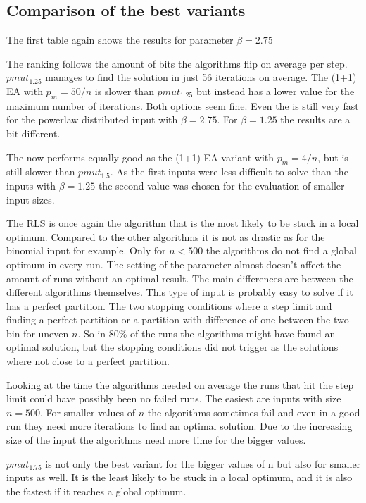 \subsection{Comparison of the best variants}
The first table again shows the results for parameter $\beta=2.75$



The ranking follows the amount of bits the algorithms flip on average per step.
$pmut_{1.25}$ manages to find the solution in just 56 iterations on average.
The (1+1) EA with $p_m=50/n$ is slower than $pmut_{1.25}$ but instead has a lower value for the maximum number of iterations.
Both options seem fine.
Even the \RLSN[4] is still very fast for the powerlaw distributed input with $\beta = 2.75$.
For $\beta = 1.25$ the results are a bit different.



The \RLSR[4] now performs equally good as the (1+1) EA variant with $p_m=4/n$, but is still slower than $pmut_{1.5}$.
As the first inputs were less difficult to solve than the inputs with $\beta = 1.25$ the second value was chosen for the evaluation of smaller input sizes.



The RLS is once again the algorithm that is the most likely to be stuck in a local optimum.
Compared to the other algorithms it is not as drastic as for the binomial input for example.
Only for $n<500$ the algorithms do not find a global optimum in every run.
The setting of the parameter almost doesn't affect the amount of runs without an optimal result.
The main differences are between the different algorithms themselves.
This type of input is probably easy to solve if it has a perfect partition.
The two stopping conditions where a step limit and finding a perfect partition or a partition with difference of one between the two bin for uneven $n$.
So in 80\% of the runs the algorithms might have found an optimal solution, but the stopping conditions did not trigger as the solutions where not close to a perfect partition.



Looking at the time the algorithms needed on average the runs that hit the step limit could have possibly been no failed runs.
The easiest are inputs with size $n=500$.
For smaller values of $n$ the algorithms sometimes fail and even in a good run they need more iterations to find an optimal solution.
Due to the increasing size of the input the algorithms need more time for the bigger values.



$pmut_{1.75}$ is not only the best variant for the bigger values of n but also for smaller inputs as well.
It is the least likely to be stuck in a local optimum, and it is also the fastest if it reaches a global optimum.
